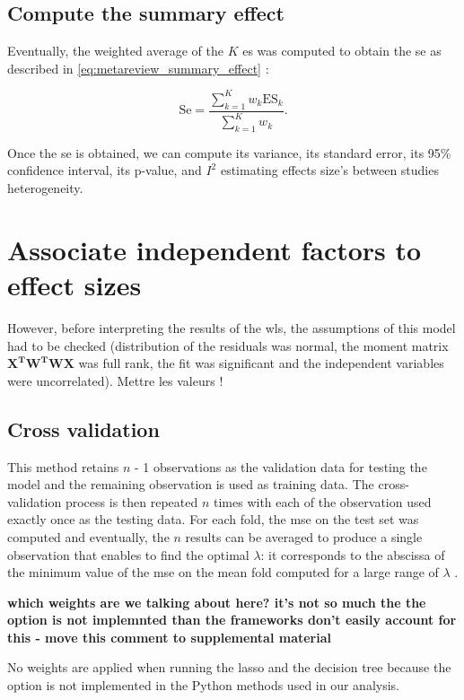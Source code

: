 \documentclass[12pt,a4paper,english]{article}
\newcommand{\comment}[1]
{\par {\bfseries \color{blue} #1 \par}} %
\begin{document}
\subsection{Compute the summary effect}

Eventually, the weighted average of the $K$ \gls{es} was computed to obtain the \gls{se} as described in 
\cref{eq:metareview_summary_effect} \citep{Borenstein2009}:

\begin{equation}
\label{eq:metareview_summary_effect}
\text{Se} = \frac{\sum_{k=1}^{K} w_k \text{ES}_k} {\sum_{k=1}^{K} w_k}.
\end{equation} 

Once the \gls{se}  is obtained, we can compute its variance, its standard error, its 95\% confidence interval, its p-value, 
and $I^2$ estimating effects size's between studies heterogeneity. 


\section{Associate independent factors to effect sizes}

However, before interpreting the results of the \gls{wls}, the assumptions of this model had to be checked (distribution of the residuals was normal,
the moment matrix $\mathbf{{X}^{T}W^{T}WX}$ was full rank, the fit was significant and the independent variables were uncorrelated). Mettre les valeurs !

\subsection{Cross validation}

This method retains $n$ - 1 observations as the validation data for testing the model and the 
remaining observation is used as training data. The cross-validation process is then repeated $n$ times with each of the observation 
used exactly once as the testing data. For each fold, the \gls{mse} on the test set was computed and eventually, the $n$ results can 
be averaged to produce a single observation that enables to find the optimal $\lambda$: it corresponds to the abscissa of the minimum
value of the \gls{mse} on the mean fold computed for a large range of $\lambda$ \citep{James2013}. 

\comment{which weights are we talking about here? it's not so much the the option is not implemnted than the frameworks don't easily account for this - move this comment to supplemental material}
No weights are applied when running the \gls{lasso} and the decision tree because the option is not implemented in the 
Python methods used in our analysis. 
\end{document}
